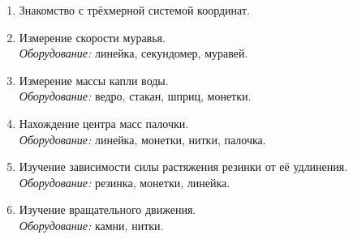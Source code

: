 \begin{enumerate}
\item Знакомство с трёхмерной системой координат. 
\item Измерение скорости муравья.  \\ \textit{Оборудование:} линейка,
  секундомер, муравей.
\item Измерение массы капли воды. \\ \textit{Оборудование:} ведро,
  стакан, шприц, монетки.
\item Нахождение центра масс палочки. \\ \textit{Оборудование:}
  линейка, монетки, нитки, палочка.
\item Изучение зависимости силы растяжения резинки от её удлинения. \\
  \textit{Оборудование:} резинка, монетки, линейка.
\item Изучение вращательного движения. \\ \textit{Оборудование:}
  камни, нитки. 
\end{enumerate}


